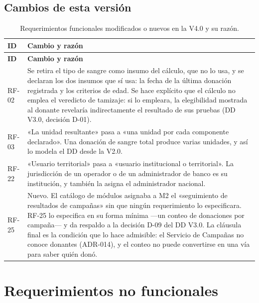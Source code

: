 \documentclass[11pt,a4paper]{article}
\begin{document}
\subsection{Cambios de esta versión}

\begin{longtable}{L{1.3cm} L{13.3cm}}
\caption{Requerimientos funcionales modificados o nuevos en la V4.0 y su razón.}\label{tab:cambiosrf}\\
\toprule
\textbf{ID} & \textbf{Cambio y razón} \\
\midrule
\endfirsthead
\toprule
\textbf{ID} & \textbf{Cambio y razón} \\
\midrule
\endhead
\bottomrule
\endlastfoot
RF-02 & Se retira el tipo de sangre como insumo del cálculo, que no lo usa, y se declaran los dos insumos que sí usa: la fecha de la última donación registrada y los criterios de edad. Se hace explícito que el cálculo no emplea el veredicto de tamizaje: si lo empleara, la elegibilidad mostrada al donante revelaría indirectamente el resultado de sus pruebas (DD V3.0, decisión D-01). \\
RF-03 & «La unidad resultante» pasa a «una unidad por cada componente declarado». Una donación de sangre total produce varias unidades, y así lo modela el DD desde la V2.0. \\
RF-22 & «Usuario territorial» pasa a «usuario institucional o territorial». La jurisdicción de un operador o de un administrador de banco es su institución, y también la asigna el administrador nacional. \\
RF-25 & Nuevo. El catálogo de módulos asignaba a M2 el «seguimiento de resultados de campañas» sin que ningún requerimiento lo especificara. RF-25 lo especifica en su forma mínima ---un conteo de donaciones por campaña--- y da respaldo a la decisión D-09 del DD V3.0. La cláusula final es la condición que lo hace admisible: el Servicio de Campañas no conoce donantes (ADR-014), y el conteo no puede convertirse en una vía para saber quién donó. \\
\end{longtable}

\section{Requerimientos no funcionales}
\label{sec:rnf}
\end{document}
